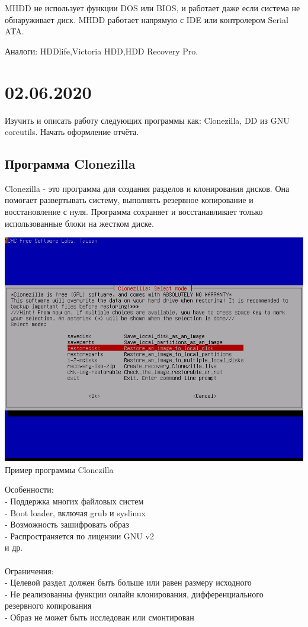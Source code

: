 \documentclass[a4paper,14pt]{extarticle}
\begin{document}
MHDD не использует функции DOS или BIOS, и работает даже если система не обнаруживает диск. MHDD работает напрямую с IDE или контролером Serial ATA.

Аналоги: HDDlife,Victoria HDD,HDD Recovery Pro.
\newpage
\section{02.06.2020}
Изучить и описать работу следующих программы как: Clonezilla, DD из GNU coreutils. Начать оформление отчёта.
\subsection{Программа Clonezilla}
Clonezilla\cite{clonezilla} - это программа для создания разделов и клонирования дисков. Она помогает развертывать систему, выполнять резервное копирование и восстановление с нуля. Программа сохраняет и восстанавливает только использованные блоки на жестком диске.
\begin{center}
  \includegraphics[scale=0.6]{img/Clonezilla1.png}\\
  Пример программы Clonezilla
\end{center}
Особенности:\\
- Поддержка многих файловых систем\\
- Boot loader, включая grub и syslinux\\
- Возможность зашифровать образ\\
- Распространяется по лицензии GNU v2\\
и др.\\ \\
Ограничения:\\
- Целевой раздел должен быть больше или равен размеру исходного\\
- Не реализованны функции онлайн клонирования, дифференциального резервного копирования\\
- Образ не может быть исследован или смонтирован
\end{document}
